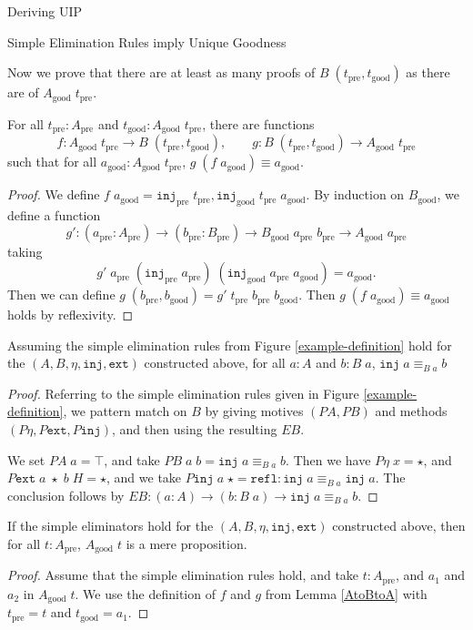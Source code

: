 \documentclass[runningheads]{llncs}
\newcommand{\pre}[1]{{#1}_\text{pre}}
\newcommand{\good}[1]{{#1}_\text{good}}
\newcommand{\Id}[2]{{#1}\equiv{#2}}
\newcommand{\IdA}[3]{{#1}\equiv_{#3}{#2}}
\newcommand{\join}{\texttt{ext}}
\newcommand{\inj}{\texttt{inj}}
\newcommand{\refl}{\texttt{refl}}
\newcommand{\PA}{\mathit{PA}}
\newcommand{\PB}{\mathit{PB}}
\newcommand{\EB}{\mathit{EB}}
\begin{document}
\begin{section}{Deriving UIP}
\begin{subsection}{Simple Elimination Rules imply Unique Goodness}

Now we prove that there are at least as many proofs of $B\;(\pre{t},\good{t})$ as there are of $\good{A}\;\pre{t}$.

\begin{lemma}[$\good{A}$ is a retract of $B$]\label{AtoBtoA}
    For all $\pre{t} : \pre{A}$ and $\good{t} : \good{A}\;\pre{t}$, there are functions \[f : \good{A}\;\pre{t} \to B\;(\pre{t},\good{t}),\qquad g : B\;(\pre{t},\good{t})\to \good{A}\;\pre{t}\] such that for all $\good{a} : \good{A}\;\pre{t}$, $\Id{g\;(f\;\good{a})}{\good{a}}$.
\end{lemma}
\begin{proof}
    We define $f\;\good{a} = \pre{\inj}\;\pre{t}, \good{\inj}\;\pre{t}\;\good{a}$.
    By induction on $\good{B}$, we define a function \[g' : (\pre{a} : \pre{A})\to(\pre{b}: \pre{B})\to\good{B}\;\pre{a}\;\pre{b}\to \good{A}\;\pre{a}\] taking \[g'\;\pre{a}\;(\pre{\inj}\;\pre{a})\;(\good{\inj}\;\pre{a}\;\good{a}) = \good{a}.\]
    Then we can define $g\;(\pre{b},\good{b}) = g'\;\pre{t}\;\pre{b}\;\good{b}$.
    Then $\Id{g\;(f\;\good{a})}{\good{a}}$ holds by reflexivity.
\end{proof}

\begin{lemma}[$B\;a$ is contractible]\label{Bcontr}
    Assuming the simple elimination rules from Figure \ref{example-definition} hold for the $(A, B, \eta, \inj, \join)$ constructed above, for all $a : A$ and $b : B\;a$, $\IdA{\inj\;a}{b}{B\;a}$
\end{lemma}
\begin{proof}
    Referring to the simple elimination rules given in Figure \ref{example-definition}, we pattern match on $B$ by giving motives $(\PA, \PB)$ and methods $(P\eta, P\join, P\inj)$, and then using the resulting $\EB$.
    
    We set $\PA\;a = \top$, and take $\PB\;a\;b = \IdA{\inj\;a}{b}{B\;a}$. Then we have $P\eta\;x = \star$, and $P\join\;a\;\star\;b\;H = \star$, and we take $P\inj\;a\;\star = \refl : \IdA{\inj\;a}{\inj\;a}{B\;a}$. The conclusion follows by $\EB : (a : A) \to (b : B\;a) \to \IdA{\inj\;a}{b}{B\;a}$.
\end{proof}

\begin{lemma}
    If the simple eliminators hold for the $(A,B,\eta,\inj,\join)$ constructed above, then for all $t : \pre{A}$, $\good{A}\;t$ is a mere proposition.
\end{lemma}
\begin{proof}
    Assume that the simple elimination rules hold, and take $t : \pre{A}$, and $a_1$ and $a_2$ in $\good{A}\;t$. We use the definition of $f$ and $g$ from Lemma \ref{AtoBtoA} with $\pre{t} = t$ and $\good{t} = a_1$.
    

\end{proof}
\end{subsection}
\end{section}
\end{document}
